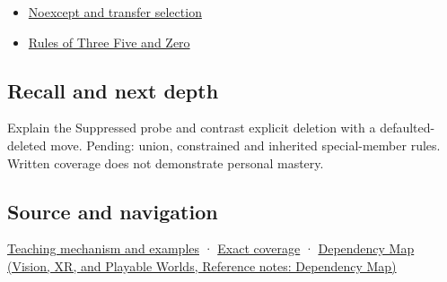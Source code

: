 \begin{itemize}
\tightlist
\item
  \hyperref[appendix-c746afaa47d1]{Noexcept and transfer selection}
\item
  \hyperref[appendix-7679107d057e]{Rules of Three Five and Zero}
\end{itemize}

\subsection{Recall and next depth}\label{appendix-42e02a12c694-recall-and-next-depth}

Explain the Suppressed probe and contrast explicit deletion with a defaulted-deleted move. Pending: union, constrained and inherited special-member rules. Written coverage does not demonstrate personal mastery.

\subsection{Source and navigation}\label{appendix-42e02a12c694-source-and-navigation}

\hyperref[01-foundations-i-ch003-let-the-compiler-compose-the-operations]{Teaching mechanism and examples} · \hyperref[appendix-fd090d982a15-m009---parts-127-147]{Exact coverage} · \href{../07-Vision-XR-and-Playable-Worlds/main.pdf\#nameddest=appendix-4ad47bdd269a}{Dependency Map (Vision, XR, and Playable Worlds, Reference notes: Dependency Map)}

